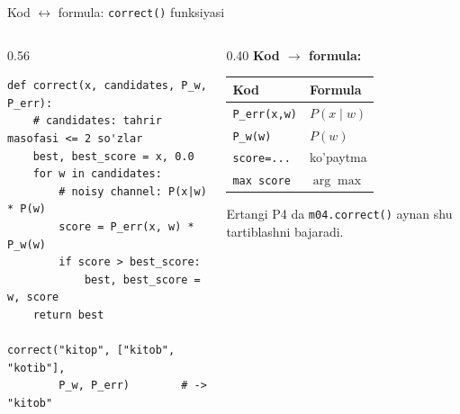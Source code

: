 \documentclass[aspectratio=169,11pt]{beamer}
\begin{document}
\begin{frame}[fragile]{Kod $\leftrightarrow$ formula: \texttt{correct()} funksiyasi}
  \begin{columns}[T]
    \begin{column}{0.56\textwidth}
\begin{lstlisting}
def correct(x, candidates, P_w, P_err):
    # candidates: tahrir masofasi <= 2 so'zlar
    best, best_score = x, 0.0
    for w in candidates:
        # noisy channel: P(x|w) * P(w)
        score = P_err(x, w) * P_w(w)
        if score > best_score:
            best, best_score = w, score
    return best

correct("kitop", ["kitob", "kotib"],
        P_w, P_err)        # -> "kitob"
\end{lstlisting}
    \end{column}
    \begin{column}{0.40\textwidth}
      \textbf{Kod $\to$ formula:}\\[3pt]
      \footnotesize
      \begin{tabular}{p{1.9cm}p{2.1cm}}
        \toprule
        Kod & Formula \\
        \midrule
        \texttt{P\_err(x,w)} & $P(x{\mid}w)$ \\
        \texttt{P\_w(w)} & $P(w)$ \\
        \texttt{score=...} & ko'paytma \\
        \texttt{max score} & $\arg\max$ \\
        \bottomrule
      \end{tabular}
      \vspace{4pt}
      \begin{tcolorbox}[okbox,top=2pt,bottom=2pt]
        \footnotesize
        Ertangi P4 da \texttt{m04.correct()} aynan shu tartiblashni
        bajaradi.
      \end{tcolorbox}
    \end{column}
  \end{columns}
\end{frame}
\end{document}
